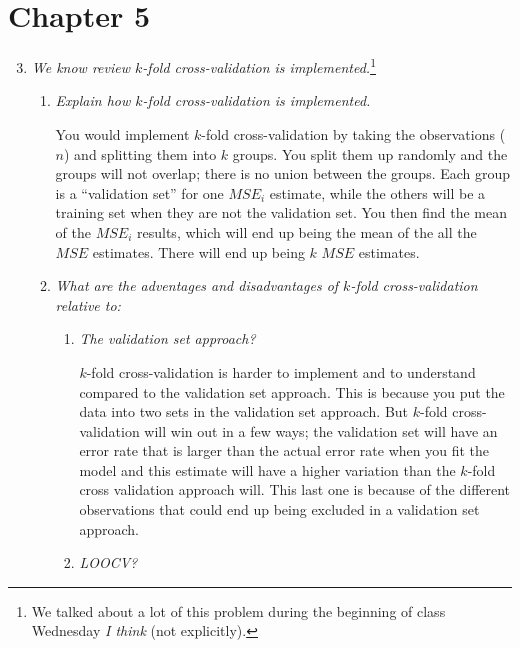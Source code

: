 \documentclass[11pt]{article}
\begin{document}
    
    
\bigskip

\section*{Chapter 5}

\begin{enumerate}
\setcounter{enumi}{2}
    \item \textit{We know review $k$-fold cross-validation is implemented.}\footnote{We talked about a lot of this problem during the beginning of class Wednesday \textit{I think} (not explicitly).}
    \begin{enumerate}
        \item \textit{Explain how $k$-fold cross-validation is implemented.}

            You would implement $k$-fold cross-validation by taking the observations ($n$) and splitting them into $k$ groups. You split them up randomly and the groups will not overlap; there is no union between the groups. Each group is a ``validation set'' for one $MSE_i$ estimate, while the others will be a training set when they are not the validation set. You then find the mean of the $MSE_i$ results, which will end up being the mean of the all the $MSE$ estimates. There will end up being $k$ $MSE$ estimates.

        \item \textit{What are the adventages and disadvantages of $k$-fold cross-validation relative to:}
        \begin{enumerate}
            \item \textit{The validation set approach?}

                $k$-fold cross-validation is harder to implement and to understand compared to the validation set approach. This is because you put the data into two sets in the validation set approach. But $k$-fold cross-validation will win out in a few ways; the validation set will have an error rate that is larger than the actual error rate when you fit the model and this estimate will have a higher variation than the $k$-fold cross validation approach will. This last one is because of the different observations that could end up being excluded in a validation set approach.
            
            \item \textit{LOOCV?}


\end{enumerate}
\end{enumerate}
\end{enumerate}
\end{document}
